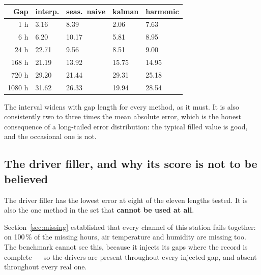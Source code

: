 \documentclass[11pt,a4paper]{article}
\begin{document}
\begin{center}
\small
\begin{tabular}{rR{1.7cm}R{1.9cm}R{1.4cm}R{1.8cm}}
\toprule
\textbf{Gap} & \textbf{interp.} & \textbf{seas.\ naive} &
\textbf{kalman} & \textbf{harmonic} \\
 h    &  3.16 &  8.39 &  2.06 &  7.63 \\
6 h    &  6.20 & 10.17 &  5.81 &  8.95 \\
24 h   & 22.71 &  9.56 &  8.51 &  9.00 \\
168 h  & 21.19 & 13.92 & 15.75 & 14.95 \\
720 h  & 29.20 & 21.44 & 29.31 & 25.18 \\
1080 h & 31.62 & 26.33 & 19.94 & 28.54 \\
\bottomrule
\end{tabular}
\end{center}


The interval widens with gap length for every method, as it must. It is also
consistently two to three times the mean absolute error, which is the honest
consequence of a long-tailed error distribution: the typical filled value is
good, and the occasional one is not.

\subsection{The driver filler, and why its score is not to be believed}
\label{sec:illusion}

The driver filler has the lowest error at eight of the eleven lengths tested. It
is also the one method in the set that \textbf{cannot be used at all}.

Section~\ref{sec:missing} established that every channel of this station fails
together: on 100\,\% of the missing hours, air temperature and humidity are
missing too. The benchmark cannot see this, because it injects its gaps where
the record is complete --- so the drivers are present throughout every injected
gap, and absent throughout every real one.

\end{document}
